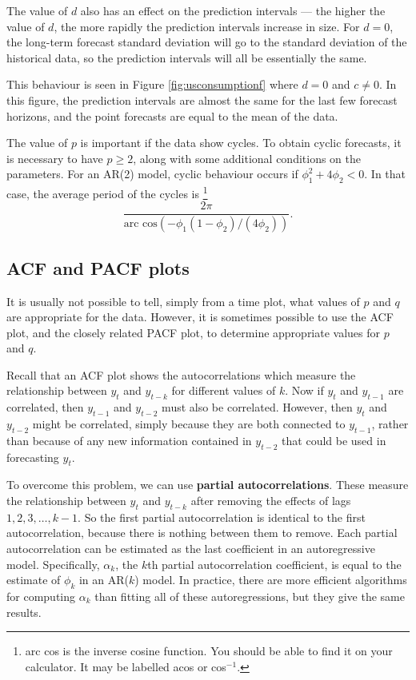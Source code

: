 \documentclass[]{book}
\let\rmarkdownfootnote\footnote%
\def\footnote{\protect\rmarkdownfootnote}
\begin{document}
The value of \(d\) also has an effect on the prediction intervals --- the higher the value of \(d\), the more rapidly the prediction intervals increase in size. For \(d=0\), the long-term forecast standard deviation will go to the standard deviation of the historical data, so the prediction intervals will all be essentially the same.

This behaviour is seen in Figure \ref{fig:usconsumptionf} where \(d=0\) and \(c\ne 0\). In this figure, the prediction intervals are almost the same for the last few forecast horizons, and the point forecasts are equal to the mean of the data.

The value of \(p\) is important if the data show cycles. To obtain cyclic forecasts, it is necessary to have \(p\ge2\), along with some additional conditions on the parameters. For an AR(2) model, cyclic behaviour occurs if \(\phi_1^2+4\phi_2<0\). In that case, the average period of the cycles is \footnote{arc cos is the inverse cosine function. You should be able to find it on your calculator. It may be labelled acos or cos\(^{-1}\).}
\[
  \frac{2\pi}{\text{arc cos}(-\phi_1(1-\phi_2)/(4\phi_2))}.
\]

\hypertarget{acf-and-pacf-plots}{%
\subsection*{ACF and PACF plots}\label{acf-and-pacf-plots}}

It is usually not possible to tell, simply from a time plot, what values of \(p\) and \(q\) are appropriate for the data. However, it is sometimes possible to use the ACF plot, and the closely related PACF plot, to determine appropriate values for \(p\) and \(q\).

Recall that an ACF plot shows the autocorrelations which measure the relationship between \(y_t\) and \(y_{t-k}\) for different values of \(k\). Now if \(y_t\) and \(y_{t-1}\) are correlated, then \(y_{t-1}\) and \(y_{t-2}\) must also be correlated. However, then \(y_t\) and \(y_{t-2}\) might be correlated, simply because they are both connected to \(y_{t-1}\), rather than because of any new information contained in \(y_{t-2}\) that could be used in forecasting \(y_t\).

To overcome this problem, we can use \textbf{partial autocorrelations}. These measure the relationship between \(y_{t}\) and \(y_{t-k}\) after removing the effects of lags \(1, 2, 3, \dots, k - 1\). So the first partial autocorrelation is identical to the first autocorrelation, because there is nothing between them to remove. Each partial autocorrelation can be estimated as the last coefficient in an autoregressive model. Specifically, \(\alpha_k\), the \(k\)th partial autocorrelation coefficient, is equal to the estimate of \(\phi_k\) in an AR(\(k\)) model. In practice, there are more efficient algorithms for computing \(\alpha_k\) than fitting all of these autoregressions, but they give the same results.
\end{document}
